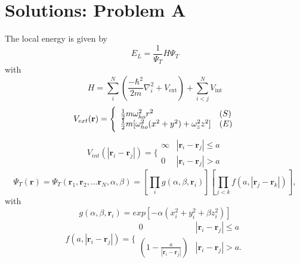 \documentclass[a4paper, 10pt, english]{revtex4-2} %
\newcommand{\txt}[1]{\text{#1}}
\begin{document}
\section*{\large Solutions: Problem A}
    The local energy is given by
    \begin{equation}
            E_L 
        =   \frac{1}{\Psi_T}H\Psi_T
    \end{equation}
    with
    \begin{equation}
            H
        =   \sum_i^N \left(\frac{-\hbar^2}{2m} \nabla_i^2 + V_\txt{ext}\right) + \sum_{i<j}^N V_\txt{int}
    \end{equation}
    \begin{equation}
            V_{ext}(\mathbf{r}) 
        =   \Bigg\{
        \begin{array}{ll}
            \frac{1}{2}m\omega_{ho}^2r^2 & (S)\\
        \strut
            \frac{1}{2}m[\omega_{ho}^2(x^2+y^2) + \omega_z^2z^2] & (E)
        \label{trap_eqn}
        \end{array}
    \end{equation}
    \begin{equation}
        V_{int}(|\mathbf{r}_i-\mathbf{r}_j|) =  \Bigg\{
        \begin{array}{ll}
            \infty & {|\mathbf{r}_i-\mathbf{r}_j|} \leq {a}\\
            0 & {|\mathbf{r}_i-\mathbf{r}_j|} > {a}
        \end{array}
    \end{equation}
    \begin{equation}
        \Psi_T(\mathbf{r})=\Psi_T(\mathbf{r}_1, \mathbf{r}_2, \dots \mathbf{r}_N,\alpha,\beta)
        =\left[
           \prod_i g(\alpha,\beta,\mathbf{r}_i)
        \right]
        \left[
           \prod_{j<k}f(a,|\mathbf{r}_j-\mathbf{r}_k|)
        \right],
        \label{eq:trialwf}
    \end{equation}
    with 
    \begin{equation}
            g(\alpha, \beta, \mathbf{r}_i)
        =   exp\left[-\alpha\left(x_i^2+y_i^2+\beta z_i^2\right)\right]
    \end{equation}
    \begin{equation}
            f(a,|\mathbf{r}_i-\mathbf{r}_j|)=\Bigg\{
        \begin{array}{ll}
            0 & {|\mathbf{r}_i-\mathbf{r}_j|} \leq {a}\\
            (1-\frac{a}{|\mathbf{r}_i-\mathbf{r}_j|}) & {|\mathbf{r}_i-\mathbf{r}_j|} > {a}.
        \end{array}
    \end{equation}
\end{document}
